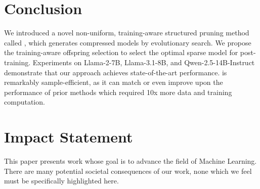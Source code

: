 \section{Conclusion}

We introduced a novel non-uniform, training-aware structured pruning method called \sysname,  which generates compressed models by evolutionary search. We propose the training-aware offspring selection to select the optimal sparse model for post-training.   Experiments on Llama-2-7B, Llama-3.1-8B, and Qwen-2.5-14B-Instruct demonstrate that our approach achieves state-of-the-art performance. \sysname is remarkably sample-efficient, as it can match or even improve upon the performance of prior methods which required 10x more data and training computation.


\section*{Impact Statement}
This paper presents work whose goal is to advance the field of 
Machine Learning. There are many potential societal consequences 
of our work, none which we feel must be specifically highlighted here.
